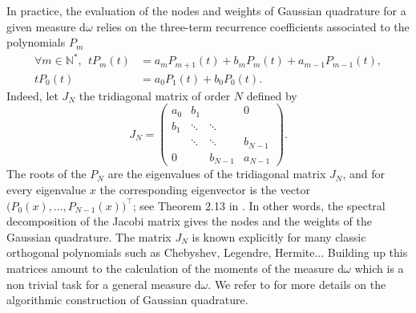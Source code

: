 \documentclass[twoside,11pt]{book}
\numberwithin{theorem}{chapter}
\numberwithin{definition}{chapter}
\numberwithin{proposition}{chapter}
\numberwithin{corollary}{chapter}
\numberwithin{example}{chapter}
\numberwithin{lemma}{chapter}
\DeclareMathOperator{\Tran}{\intercal}
\begin{document}
In practice, the evaluation of the nodes and weights of Gaussian quadrature for a given measure $\mathrm{d}\omega$ relies on  the three-term recurrence coefficients associated to the polynomials $P_{m}$
\begin{align}\label{eq:OP_reccurence_1}
\forall m \in \mathbb{N}^{*}, \:\:t P_{m}(t) & = a_{m}P_{m+1}(t) + b_{m}P_{m}(t) + a_{m-1}P_{m-1}(t),\\
\label{eq:OP_reccurence_2}
t P_{0}(t) & = a_{0}P_{1}(t) + b_{0}P_{0}(t) .
\end{align}
Indeed, let $J_{N}$ the tridiagonal matrix of order $N$ defined by
\begin{equation}
J_N = \left( \begin{array}{cccc}
a_{0} & b_{1} & & 0\\
b_{1} & \ddots & \ddots & \\
& \ddots & \ddots & b_{N-1} \\
0 & & b_{N-1} & a_{N-1} \end{array} \right).
\end{equation}
The roots of the $P_{N}$ are the eigenvalues of the tridiagonal matrix $J_{N}$, and for every eigenvalue $x$ the corresponding eigenvector is the vector $\big(P_{0}(x), \dots, P_{N-1}(x) \big)^{\Tran}$; see Theorem 2.13 in \citep{GoMe09}. In other words, the spectral decomposition of the Jacobi matrix gives the nodes and the weights of the Gaussian quadrature. The matrix $J_{N}$ is known explicitly for many classic orthogonal polynomials such as Chebyshev, Legendre, Hermite... Building up this matrices amount to the calculation of the moments of the measure $\mathrm{d}\omega$ which is a non trivial task for a general measure $\mathrm{d}\omega$. We refer to \citep{GoMe09} for more details on the algorithmic construction of Gaussian quadrature.
\end{document}
